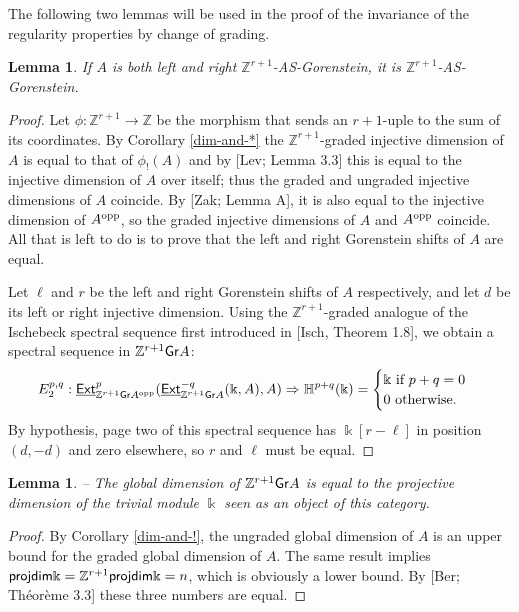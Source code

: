 \documentclass[twoside,11pt]{article}
\renewcommand{\k}{\Bbbk}
\newcommand{\Z}{{\mathbb Z}}
\newcommand{\GrMod}{{\sf Gr}}
\newcommand{\EXT}{\underline{\sf Ext}}
\newcommand{\opp}{{\rm opp}}
\newcommand{\pd}{{\sf projdim}}
\newtheorem{sublemma}[subtheorem]{Lemma}
\begin{document}
The following two lemmas will be used in the proof of the invariance of the regularity
properties by change of grading.
\begin{sublemma} 
\label{spe-seq-and-csq}
If $A$ is both left and right $\Z^{r+1}$-AS-Gorenstein, it is $\Z^{r+1}$-AS-Gorenstein. 
\end{sublemma}
\begin{proof}
Let $\phi: \Z^{r+1} \to \Z$ be the morphism that sends an $r+1$-uple to the sum of its
coordinates. By Corollary \ref{dim-and-*} the $\Z^{r+1}$-graded injective dimension of $A$
is equal to that of $\phi_!(A)$ and by [Lev; Lemma 3.3] this is equal to the injective
dimension of $A$ over itself; thus the graded and ungraded injective dimensions of $A$
coincide. By [Zak; Lemma A], it is also equal to the injective dimension of $A^\opp$, so
the graded injective dimensions of $A$ and $A^\opp$ coincide. All that is left to do is to
prove that the left and right Gorenstein shifts of $A$ are equal.

Let $\ell$ and $r$ be the left and right Gorenstein shifts of $A$ respectively, and let $d$
be its left or right injective dimension. Using the $\Z^{r+1}$-graded analogue of the
Ischebeck spectral sequence first introduced in [Isch, Theorem 1.8], we obtain a spectral
sequence in $\Z^{r+1}\GrMod A$:
\[
	E_2^{p,q}: \EXT_{\Z^{r+1}\GrMod A^\opp}^p(\EXT_{\Z^{r+1}\GrMod A}^{-q}(\k, A), A)
		\Rightarrow \mathbb H^{p+q}(\k) = \begin{cases} \k \mbox{ if } p + q = 0 \\ 0 \mbox{
		otherwise.}\end{cases}
\]
By hypothesis, page two of this spectral sequence has $\k[r - \ell]$ in position $(d,-d)$
and zero elsewhere, so $r$ and $\ell$ must be equal.
\end{proof}

\begin{sublemma} -- \label{gl-dim}
The global dimension of $\Z^{r+1}\GrMod A$ is equal to the projective dimension of the
trivial module $\k$ seen as an object of this category.
\end{sublemma}

\begin{proof} 
By Corollary \ref{dim-and-!}, the ungraded global dimension of $A$ is an upper bound for
the graded global dimension of $A$. The same result implies $\pd \k = \Z^{r+1}\pd \k = n$,
which is obviously a lower bound. By [Ber; Th\'eor\`eme 3.3] these three numbers are
equal.
\end{proof}
\end{document}
